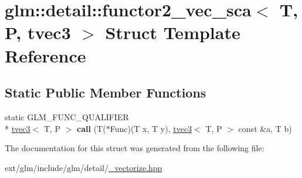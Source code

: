 \hypertarget{structglm_1_1detail_1_1functor2__vec__sca_3_01_t_00_01_p_00_01tvec3_01_4}{\section{glm\-:\-:detail\-:\-:functor2\-\_\-vec\-\_\-sca$<$ T, P, tvec3 $>$ Struct Template Reference}
\label{structglm_1_1detail_1_1functor2__vec__sca_3_01_t_00_01_p_00_01tvec3_01_4}
}
\subsection*{Static Public Member Functions}
\begin{DoxyCompactItemize}
\item 
\hypertarget{structglm_1_1detail_1_1functor2__vec__sca_3_01_t_00_01_p_00_01tvec3_01_4_a9abcc48de3dedce9cbb07d47d520dbc5}{static G\-L\-M\-\_\-\-F\-U\-N\-C\-\_\-\-Q\-U\-A\-L\-I\-F\-I\-E\-R \\*
\hyperlink{structglm_1_1tvec3}{tvec3}$<$ T, P $>$ {\bfseries call} (T($\ast$Func)(T x, T y), \hyperlink{structglm_1_1tvec3}{tvec3}$<$ T, P $>$ const \&a, T b)}\label{structglm_1_1detail_1_1functor2__vec__sca_3_01_t_00_01_p_00_01tvec3_01_4_a9abcc48de3dedce9cbb07d47d520dbc5}

\end{DoxyCompactItemize}


The documentation for this struct was generated from the following file\-:\begin{DoxyCompactItemize}
\item 
ext/glm/include/glm/detail/\hyperlink{__vectorize_8hpp}{\-\_\-vectorize.\-hpp}\end{DoxyCompactItemize}
